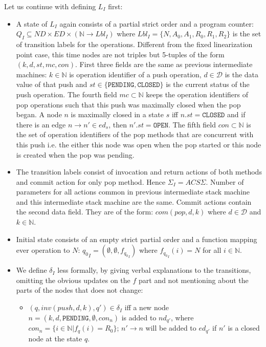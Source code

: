 Let us continue with defining $L_I$ first:
\begin{itemize}
\item A state of $L_I$ again consists of a partial strict order and a program counter: $Q_I \subseteq ND \times ED \times (\mathbb{N} \rightarrow Lbl_I)$ where $Lbl_I = \{N, A_0, A_1, R_0, R_1, R_2\}$ is the set of transition labels for the operations. Different from the fixed linearization point case, this time nodes are not triples but 5-tuples of the form $(k,d,st,mc,con)$. First three fields are the same as previous intermediate machines: $k \in \mathbb{N}$ is operation identifier of a push operation, $d \in \mathcal{D}$ is the data value of that push and $st \in \{\texttt{PENDING}, \texttt{CLOSED}\}$ is the current status of the push operation. The fourth field $mc \subset \mathbb{N}$ keeps the operation identifiers of pop operations such that this push was maximally closed when the pop began. A node $n$ is maximally closed in a state $s$ iff $n.st  = \texttt{CLOSED}$ and if there is an edge $n \rightarrow n' \in ed_s$, then $n'.st = \texttt{OPEN}$. The fifth field $con \subset \mathbb{N}$ is the set of operation identifiers of the pop methods that are concurrent with this push i.e. the either this node was open when the pop started or this node is created when the pop was pending.
\item The transition labels consist of invocation and return actions of both methods and commit action for only pop method. Hence $\Sigma_I = ACS\Sigma$. Number of parameters for all actions common in previous intermediate stack machine and this intermediate stack machine are the same. Commit actions contain the second data field. They are of the form: $com(pop,d,k)$ where $d \in \mathcal{D}$ and $k \in \mathbb{N}$. 
\item Initial state consists of an empty strict partial order and a function mapping ever operation to $N$: ${q_0}_I = (\emptyset, \emptyset, f_{{q_0}_I})$ where  $f_{{q_0}_I}(i) =N$ for all $i \in \mathbb{N}$.
\item We define $\delta_I$ less formally, by giving verbal explanations to the transitions, omitting the obvious updates on the $f$ part and not mentioning about the parts of the nodes that does not change:
\begin{itemize}
\item $(q, inv(push,d,k),q') \in \delta_I$ iff a new node $n=(k,d,\texttt{PENDING}, \emptyset, con_n)$ is added to $nd_{q'}$, where $con_n = \{ i \in \mathbb{N}| f_q(i) = R_0\}$; $n' \rightarrow n$ will be added to $ed_{q'}$ if $n'$ is a closed node at the state $q$.

\end{itemize}
\end{itemize}
